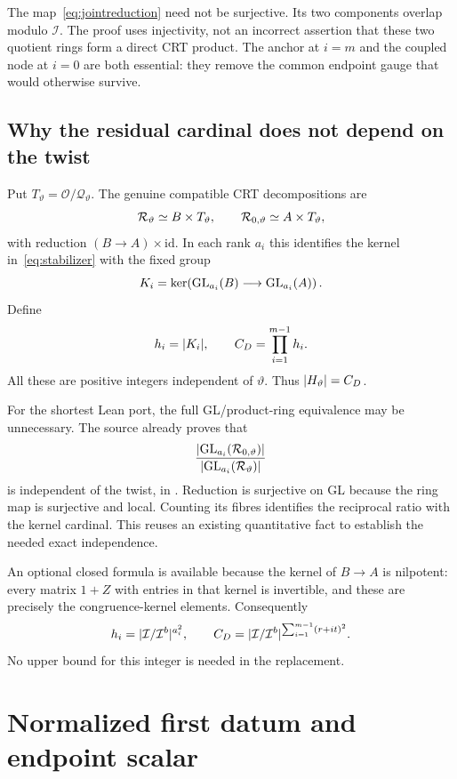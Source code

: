 The map~\eqref{eq:jointreduction} need not be surjective. Its two components overlap modulo $\mathcal I$. The proof uses injectivity, not an incorrect assertion that these two quotient rings form a direct CRT product. The anchor at $i=m$ and the coupled node at $i=0$ are both essential: they remove the common endpoint gauge that would otherwise survive.

\subsection{Why the residual cardinal does not depend on the twist}

Put $T_\vartheta=\mathcal O/\mathcal Q_\vartheta$. The genuine compatible CRT decompositions are
\[
 \mathcal R_\vartheta\simeq B\times T_\vartheta,
 \qquad
 \mathcal R_{0,\vartheta}\simeq A\times T_\vartheta,
\]
with reduction $(B\to A)\times\mathrm{id}$. In each rank $a_i$ this identifies the kernel in~\eqref{eq:stabilizer} with the fixed group
\[
 K_i=\ker\!\left(\operatorname{GL}_{a_i}(B)\longrightarrow\operatorname{GL}_{a_i}(A)\right).
\]
Define
\begin{equation}\label{eq:h}
 h_i=\lvert K_i\rvert,\qquad C_D=\prod_{i=1}^{m-1}h_i.
\end{equation}
All these are positive integers independent of $\vartheta$. Thus $\lvert H_\vartheta\rvert=C_D$.

For the shortest Lean port, the full GL/product-ring equivalence may be unnecessary. The source already proves that
\[
 \frac{\lvert \operatorname{GL}_{a_i}(\mathcal R_{0,\vartheta})\rvert}
      {\lvert \operatorname{GL}_{a_i}(\mathcal R_\vartheta)\rvert}
\]
is independent of the twist, in . Reduction is surjective on GL because the ring map is surjective and local. Counting its fibres identifies the reciprocal ratio with the kernel cardinal. This reuses an existing quantitative fact to establish the needed exact independence.

An optional closed formula is available because the kernel of $B\to A$ is nilpotent: every matrix $1+Z$ with entries in that kernel is invertible, and these are precisely the congruence-kernel elements. Consequently
\[
 h_i=\lvert \mathcal I/\mathcal I^b\rvert^{a_i^2},
 \qquad
 C_D=\lvert \mathcal I/\mathcal I^b\rvert^{\sum_{i=1}^{m-1}(r+it)^2}.
\]
No upper bound for this integer is needed in the replacement.

\section{Normalized first datum and endpoint scalar}
\label{sec:normalized}

